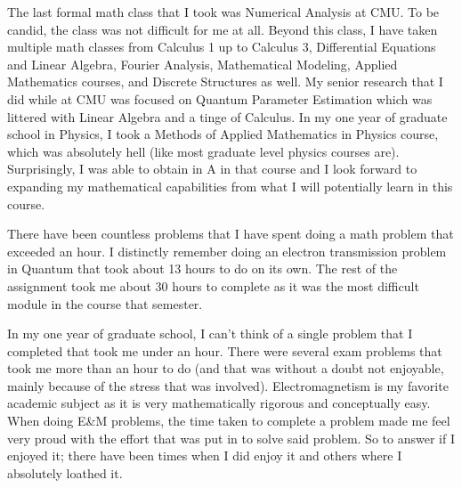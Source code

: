  {
    \begin{Highlight}
        The last formal math class that I took was Numerical Analysis at CMU. To be candid, the class was not difficult for me at all. Beyond this class, I have taken multiple math classes from
        Calculus 1 up to Calculus 3, Differential Equations and Linear Algebra, Fourier Analysis, Mathematical Modeling, Applied Mathematics courses, and Discrete Structures as well. My senior 
        research that I did while at CMU was focused on Quantum Parameter Estimation which was littered with Linear Algebra and a tinge of Calculus. In my one year of graduate school in Physics, 
        I took a Methods of Applied Mathematics in Physics course, which was absolutely hell (like most graduate level physics courses are). Surprisingly, I was able to obtain in A in that course 
        and I look forward to expanding my mathematical capabilities from what I will potentially learn in this course.
    \end{Highlight}
}

 {
    \begin{Highlight}
        There have been countless problems that I have spent doing a math problem that exceeded an hour. I distinctly remember doing an electron transmission problem in Quantum that took about 13 
        hours to do on its own. The rest of the assignment took me about 30 hours to complete as it was the most difficult module in the course that semester.

        In my one year of graduate school, I can't think of a single problem that I completed that took me under an hour. There were several exam problems that took me more than an hour to do (and 
        that was without a doubt not enjoyable, mainly because of the stress that was involved). Electromagnetism is my favorite academic subject as it is very mathematically rigorous and conceptually
        easy. When doing E\&M problems, the time taken to complete a problem made me feel very proud with the effort that was put in to solve said problem. So to answer if I enjoyed it; there have been
        times when I did enjoy it and others where I absolutely loathed it.
    \end{Highlight}
}

